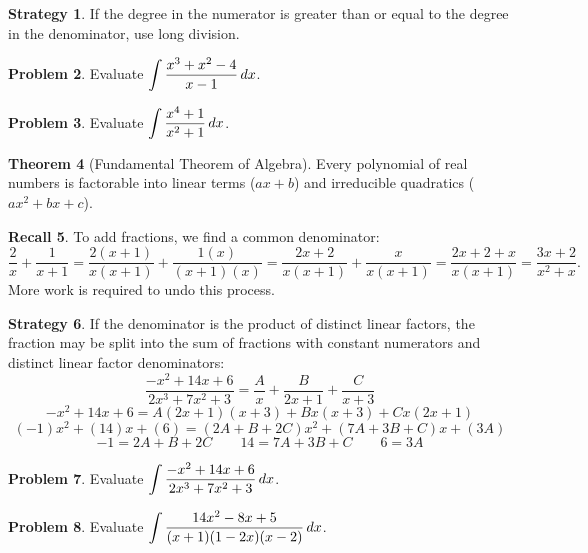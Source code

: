 \documentclass[letterpaper, twoside, 12pt]{book}
\theoremstyle{definition}
\newtheorem{theorem}{Theorem}
\newtheorem{recall}[theorem]{Recall}
\theoremstyle{definition}
\newtheorem{problem}[theorem]{Problem}
\newtheorem{strategy}[theorem]{Strategy}
\newcommand{\ds}{\ensuremath{\displaystyle}}
\begin{document}
\begin{strategy}
 If the degree in the numerator is greater than or equal to the degree in the
 denominator, use long division.
\end{strategy}

\begin{problem}
 Evaluate $\ds \int \frac{x^3 + x^2 - 4}{x-1} \, dx$.
\end{problem}

\vfill

\begin{problem}
 Evaluate $\ds \int \frac{x^4+1}{x^2+1} \, dx$.
\end{problem}

\vfill

\begin{theorem}[Fundamental Theorem of Algebra]
 Every polynomial of real numbers is factorable into linear terms ($ax+b$)
 and irreducible quadratics ($ax^2+bx+c$).
\end{theorem}

\begin{recall}
  To add fractions, we find a common denominator:
  \[
    \frac{2}{x} + \frac{1}{x+1}
      =
    \frac{2(x+1)}{x(x+1)} + \frac{1(x)}{(x+1)(x)}
      =
    \frac{2x+2}{x(x+1)} + \frac{x}{x(x+1)}
      =
    \frac{2x+2+x}{x(x+1)}
      =
    \frac{3x+2}{x^2+x}.
  \]
  More work is required to undo this process.
\end{recall}

\newpage

\begin{strategy}
 If the denominator is the product of distinct linear factors,
 the fraction may be split into the sum of fractions with constant numerators
 and distinct linear factor denominators:
  \[
    \frac{-x^2+14x+6}{2x^3+7x^2+3}
      =
    \frac{A}{x} + \frac{B}{2x+1} + \frac{C}{x+3}
  \]
  \[
    -x^2+14x+6 = A(2x+1)(x+3) + Bx(x+3) + Cx(2x+1)
  \]
  \[
    (-1)x^2+(14)x+(6) = (2A+B+2C)x^2 + (7A+3B+C)x + (3A)
  \]
  \[
    -1 = 2A+B+2C \qquad 14=7A+3B+C \qquad 6 = 3A
  \]
\end{strategy}

\begin{problem}
 Evaluate $\ds \int \frac{-x^2+14x+6}{2x^3+7x^2+3} \, dx$.
\end{problem}

\vfill

\begin{problem}
 Evaluate $\ds \int \frac{14x^2-8x+5}{(x+1)(1-2x)(x-2)} \, dx$.
\end{problem}
\end{document}

